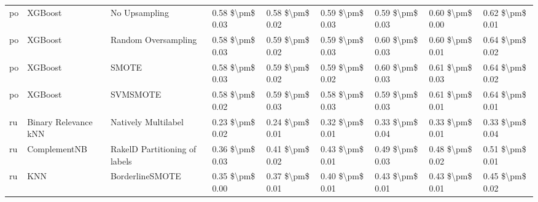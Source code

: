 \begin{tabular}{lllllllll}
      po &                         XGBoost &                 No Upsampling & 0.58 \$\textbackslash pm\$ 0.03 &           0.58 \$\textbackslash pm\$ 0.02 &       0.59 \$\textbackslash pm\$ 0.03 &        0.59 \$\textbackslash pm\$ 0.03 &                         0.60 \$\textbackslash pm\$ 0.00 &     0.62 \$\textbackslash pm\$ 0.01 \\
      po &                         XGBoost &           Random Oversampling & 0.58 \$\textbackslash pm\$ 0.03 &           0.59 \$\textbackslash pm\$ 0.02 &       0.59 \$\textbackslash pm\$ 0.03 &        0.60 \$\textbackslash pm\$ 0.03 &                         0.60 \$\textbackslash pm\$ 0.01 &     0.64 \$\textbackslash pm\$ 0.02 \\
      po &                         XGBoost &                         SMOTE & 0.58 \$\textbackslash pm\$ 0.03 &           0.59 \$\textbackslash pm\$ 0.02 &       0.59 \$\textbackslash pm\$ 0.02 &        0.60 \$\textbackslash pm\$ 0.03 &                         0.61 \$\textbackslash pm\$ 0.03 &     0.64 \$\textbackslash pm\$ 0.02 \\
      po &                         XGBoost &                      SVMSMOTE & 0.58 \$\textbackslash pm\$ 0.02 &           0.59 \$\textbackslash pm\$ 0.03 &       0.58 \$\textbackslash pm\$ 0.03 &        0.59 \$\textbackslash pm\$ 0.03 &                         0.61 \$\textbackslash pm\$ 0.01 &     0.64 \$\textbackslash pm\$ 0.01 \\
      ru &            Binary Relevance kNN &           Natively Multilabel & 0.23 \$\textbackslash pm\$ 0.02 &           0.24 \$\textbackslash pm\$ 0.01 &       0.32 \$\textbackslash pm\$ 0.01 &        0.33 \$\textbackslash pm\$ 0.04 &                         0.33 \$\textbackslash pm\$ 0.01 &     0.33 \$\textbackslash pm\$ 0.04 \\
      ru &                    ComplementNB & RakelD Partitioning of labels & 0.36 \$\textbackslash pm\$ 0.03 &           0.41 \$\textbackslash pm\$ 0.02 &       0.43 \$\textbackslash pm\$ 0.01 &        0.49 \$\textbackslash pm\$ 0.03 &                         0.48 \$\textbackslash pm\$ 0.02 &     0.51 \$\textbackslash pm\$ 0.01 \\
      ru &                             KNN &               BorderlineSMOTE & 0.35 \$\textbackslash pm\$ 0.00 &           0.37 \$\textbackslash pm\$ 0.01 &       0.40 \$\textbackslash pm\$ 0.01 &        0.43 \$\textbackslash pm\$ 0.01 &                         0.43 \$\textbackslash pm\$ 0.01 &     0.45 \$\textbackslash pm\$ 0.02 \\

\end{tabular}
